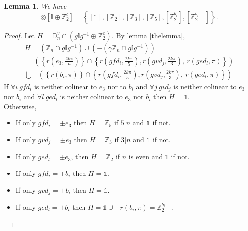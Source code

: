 \documentclass[11pt,a4paper]{amsart}
\newtheorem{lem}[thm]{Lemma}
\theoremstyle{definition}
\newcommand{\ZZ}{\mathbb{Z}}                %
\newcommand{\ico}{\mathbb{I}}               %
\newcommand{\DD}{\mathbb{D}}                %
\newcommand{\1}{\mathds{1}}		            %
\newcommand{\set}[1]{\left\{#1\right\}}     %
\begin{document}
\begin{lem}
We have
\begin{equation*}
[\DD_{n}^{v}] \circledcirc [\ico \oplus \ZZ_2^c]=\set{[\1],[\ZZ_2],[\ZZ_3],[\ZZ_5],[\ZZ_{2}^{b_i}],[\ZZ_{2}^{b_i-}]}.
\end{equation*}
\end{lem}
\begin{proof}
Let $H=\DD_{n}^v \cap (g \ico g^{-1} \oplus \ZZ_2^c)$.
By lemma \ref{thelemma},
\begin{multline*}
H=(\ZZ_n\cap g \ico g^{-1})\cup (-(\gamma\ZZ_n\cap g \ico g^{-1}))\\
 =\left(\set{r(e_3,\frac{2k\pi}{n})}\cap \set{r(gfd_i,\frac{2k\pi}{5}),r(gvd_j,\frac{2k\pi}{3}),\ r(ged_l,\pi)}\right)\\
 \bigcup-\left(\set{r(b_i,\pi)}\cap \set{r(gfd_i,\frac{2k\pi}{5}),r(gvd_j,\frac{2k\pi}{3}),\ r(ged_l,\pi)}\right)
\end{multline*}
If $\forall i\ gfd_i$ is neither colinear to $e_3$ nor to $b_i$ and $\forall j\ gvd_j$ is neither colinear to $e_3$ nor $b_i$ and $\forall l\ ged_l$ is neither colinear to $e_3$ nor $b_i$ then $H=\1$.\\
Otherwise,
\begin{itemize}
\item If only $gfd_i=\pm e_3$ then $H=\ZZ_5$ if $5|n$ and $\1$ if not.
\item If only $gvd_j=\pm e_3$ then $H=\ZZ_3$ if $3|n$ and $\1$ if not.
\item If only $ged_l=\pm e_3$, then $H=\ZZ_2$ if $n$ is even and $\1$ if not.
\item If only $gfd_i=\pm b_i$ then $H=\1$.
\item If only $gvd_j=\pm b_i$ then $H=\1$.
\item If only $ged_l=\pm b_i$ then $H=\1\cup -{r(b_i,\pi)}=\ZZ_2^{b_i-}.$
\end{itemize}
\end{proof}
\end{document}
